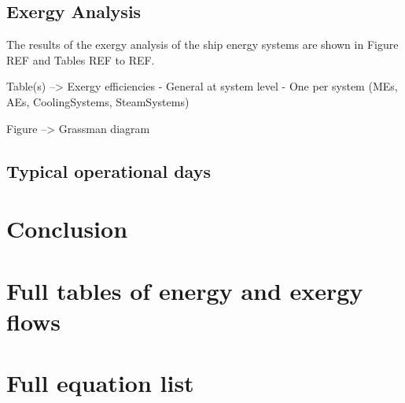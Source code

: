 \documentclass[preprint,12pt]{elsarticle}
\begin{document}
\subsection{Exergy Analysis} \label{sec:res:exergy}

The results of the exergy analysis of the ship energy systems are shown in Figure REF and Tables REF to REF. 

Table(s) --> Exergy efficiencies
- General at system level
- One per system (MEs, AEs, CoolingSystems, SteamSystems)

Figure --> Grassman diagram





\subsection{Typical operational days}  \label{sec:res:typicalDays}




\section{Conclusion}
\label{sec:conclusion}















\appendix

\section{Full tables of energy and exergy flows}

\section{Full equation list}
\end{document}
